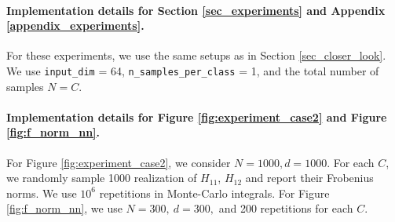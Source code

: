\documentclass{article}
\newcommand{\1}{^{(1)}}
\newcommand{\2}{^{(2)}}
\begin{document}
\paragraph{Implementation details for Section \ref{sec_experiments} and Appendix \ref{appendix_experiments}.} For these experiments, we use the same setups as in Section \ref{sec_closer_look}. 
We use \texttt{input\_dim} = 64, \texttt{n\_samples\_per\_class} = 1, and  the total number of samples $N = C$. 


\paragraph{Implementation details for Figure \ref{fig:experiment_case2} and Figure \ref{fig:f_norm_nn}.} For Figure \ref{fig:experiment_case2}, we consider $N = 1000, d= 1000$. For each $C$,   we randomly sample 1000 realization of $H_{11}$, $H_{12}$ and report their Frobenius norms.  We use $10^6$ repetitions in Monte-Carlo integrals.
For Figure \ref{fig:f_norm_nn}, we use $N=300,\ d=300,$ and 200 repetitions for each $C$.








\clearpage





\end{document}
